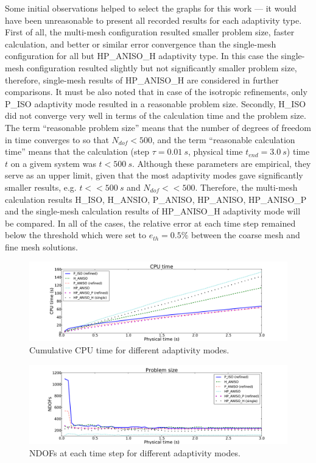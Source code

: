 Some initial observations
helped to select the graphs for this work --- it would have been unreasonable 
to present all recorded results for each adaptivity type.
First of all, the multi-mesh configuration resulted smaller problem size, faster
calculation, and better or similar error convergence than the single-mesh
configuration for all but HP\_ANISO\_H adaptivity type. In this case
the single-mesh configuration resulted slightly but not significantly
smaller problem size, therefore, single-mesh results of HP\_ANISO\_H
are considered in further comparisons. It must be also noted that in case of the isotropic
refinements, only P\_ISO adaptivity mode resulted in a reasonable problem size.
Secondly, H\_ISO did not converge very well in terms of the
calculation time and the problem size. The term ``reasonable problem size''
means that the number of degrees of freedom in time converges
to so that $N_{dof}<500$, and the term ``reasonable calculation time''
means that the calculation (step $\tau=0.01\ s$, physical
time $t_{end}=3.0\ s$) time $t$ on a givem system was $t<500\ s$.
Although these parameters are empirical, they serve as an upper limit, given
that the most adaptivity modes gave significantly smaller results,
e.g. $t<<500\ s$ and $N_{dof} << 500$.
Therefore, the multi-mesh calculation results H\_ISO, H\_ANSIO, P\_ANISO,
HP\_ANISO, HP\_ANISO\_P and the single-mesh calculation results of HP\_ANISO\_H
adaptivity mode will be compared. In all of the cases, the relative 
error at each time step remained below
the threshold which were set to $e_{th}=0.5\%$ between the coarse mesh
and fine mesh solutions.

\begin{figure}
  \begin{centering}
  \includegraphics[width=\columnwidth]{cpu}
  \caption{\label{fig:cpu} Cumulative CPU time for different adaptivity modes.}
  \end{centering}
\end{figure}

\begin{figure}
  \begin{centering}
  \includegraphics[width=\columnwidth]{dof}
  \caption{\label{fig:dof} NDOFs at each time step for different adaptivity modes.}
  \end{centering}
\end{figure}

